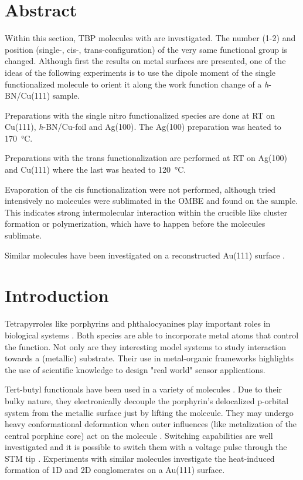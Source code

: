 \label{section:TBP}
\section{Abstract}
Within this section, TBP molecules with are investigated. The number (1-2) and position (single-, cis-, trans-configuration) of the very same functional group is changed. Although first the results on metal surfaces are presented, one of the ideas of the following experiments is to use the dipole moment of the single functionalized molecule to orient it along the work function change of a \textit{h}-BN/Cu(111) sample. 

Preparations with the single nitro functionalized species are done at RT on Cu(111), \textit{h}-BN/Cu-foil and Ag(100). The Ag(100) preparation was heated to \SI{170}{\celsius}. 

Preparations with the trans functionalization are performed at RT on Ag(100) and Cu(111) where the last was heated to \SI{120}{\celsius}.

Evaporation of the cis functionalization were not performed, although tried intensively no molecules were sublimated in the OMBE and found on the sample. This indicates strong intermolecular interaction within the crucible like cluster formation or polymerization, which have to happen before the molecules sublimate.

Similar molecules have been investigated on a reconstructed Au(111) surface \cite{yokoyama_selective_2001}.

\section{Introduction}
Tetrapyrroles like porphyrins and phthalocyanines play important roles in biological systems \cite{battersby_tetrapyrroles_2000}. Both species are able to incorporate metal atoms that control the function. Not only are they interesting model systems to study interaction towards a (metallic) substrate\cite{auwarter_porphyrins_2015, auwarter_controlled_2007, diller_vacuo_2016}. Their use in metal-organic frameworks highlights the use of scientific knowledge to design "real world" sensor applications\cite{Lustig_Metal-organic_2017}. 

Tert-butyl functionals have been used in a variety of molecules \cite{moresco_conformational_2001}. Due to their bulky nature, they electronically decouple the porphyrin’s delocalized p-orbital system from the metallic surface just by lifting the molecule. They may undergo heavy conformational deformation when outer influences (like metalization of the central porphine core) act on the molecule \cite{stark_massive_2014}. Switching capabilities are well investigated \cite{loppacher_direct_2003} and it is possible to switch them with a voltage pulse through the STM tip \cite{ditze_energetics_2014}. Experiments with similar molecules investigate the heat-induced formation of 1D and 2D conglomerates on a Au(111) surface.\cite{pham_heat-induced_2015}

